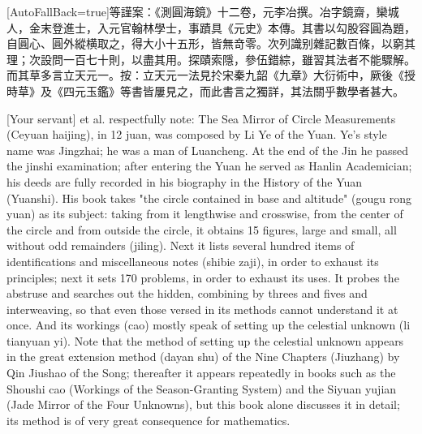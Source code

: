 \documentclass[11pt]{article}
\newcommand{\zhsmall}{\footnotesize\color{black!70}}
\newcommand{\unitlabel}[1]{\marginpar{\raggedleft\tiny\color{gray}#1}}
\newenvironment{unitzh}{\par\CJKfontspec{Noto Serif CJK SC}[AutoFallBack=true]\large\linespread{1.25}\selectfont}{\par}
\newenvironment{uniten}{\par\small\color{black!85}}{\par\medskip}
\begin{document}
\begin{unitzh}\unitlabel{ceyuan-001.3}{\zhsmall 臣}等謹案：《測圓海鏡》十二卷，元李冶撰。冶字鏡齋，欒城人，金末登進士，入元官翰林學士，事蹟具《元史》本傳。其書以勾股容圓為題，自圓心、圓外縱横取之，得大小十五形，皆無竒零。次列識别雜記數百條，以窮其理；次設問一百七十則，以盡其用。探賾索隱，參伍錯綜，雖習其法者不能驟解。而其草多言立天元一。按：立天元一法見扵宋秦九韶《九章》大衍術中，厥後《授時草》及《四元玉鑑》等書皆屢見之，而此書言之獨詳，其法關乎數學者甚大。\end{unitzh}
\begin{uniten}[Your servant] et al. respectfully note: The Sea Mirror of Circle Measurements (Ceyuan haijing), in 12 juan, was composed by Li Ye of the Yuan. Ye's style name was Jingzhai; he was a man of Luancheng. At the end of the Jin he passed the jinshi examination; after entering the Yuan he served as Hanlin Academician; his deeds are fully recorded in his biography in the History of the Yuan (Yuanshi). His book takes "the circle contained in base and altitude" (gougu rong yuan) as its subject: taking from it lengthwise and crosswise, from the center of the circle and from outside the circle, it obtains 15 figures, large and small, all without odd remainders (jiling). Next it lists several hundred items of identifications and miscellaneous notes (shibie zaji), in order to exhaust its principles; next it sets 170 problems, in order to exhaust its uses. It probes the abstruse and searches out the hidden, combining by threes and fives and interweaving, so that even those versed in its methods cannot understand it at once. And its workings (cao) mostly speak of setting up the celestial unknown (li tianyuan yi). Note that the method of setting up the celestial unknown appears in the great extension method (dayan shu) of the Nine Chapters (Jiuzhang) by Qin Jiushao of the Song; thereafter it appears repeatedly in books such as the Shoushi cao (Workings of the Season-Granting System) and the Siyuan yujian (Jade Mirror of the Four Unknowns), but this book alone discusses it in detail; its method is of very great consequence for mathematics.\end{uniten}
\end{document}
